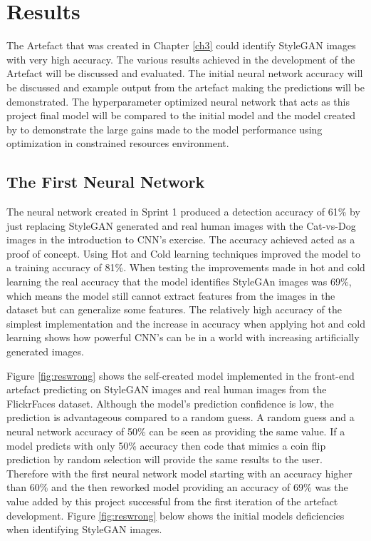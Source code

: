 \chapter{Results}

The Artefact that was created in Chapter \ref{ch3} could identify StyleGAN images with very high accuracy. The various results achieved in the development of the Artefact will be discussed and evaluated. The initial neural network accuracy will be discussed and example output from the artefact making the predictions will be demonstrated. The hyperparameter optimized neural network that acts as this project final model will be compared to the initial model and the model created by \cite{Wang} to demonstrate the large gains made to the model performance using optimization in constrained resources environment. 

\section{The First Neural Network}

The neural network created in Sprint 1 produced a detection accuracy of 61\% by just replacing StyleGAN generated and real human images with the Cat-vs-Dog images in the introduction to CNN's exercise. The accuracy achieved acted as a proof of concept. Using Hot and Cold learning techniques improved the model to a training accuracy of 81\%. When testing the improvements made in hot and cold learning the real accuracy that the model identifies StyleGAn images was 69\%, which means the model still cannot extract features from the images in the dataset but can generalize some features. The relatively high accuracy of the simplest implementation and the increase in accuracy when applying hot and cold learning shows how powerful CNN's can be in a world with increasing artificially generated images. 

Figure \ref{fig:reswrong} shows the self-created model implemented in the front-end artefact predicting on StyleGAN images and real human images from the FlickrFaces dataset. Although the model's prediction confidence is low, the prediction is advantageous compared to a random guess. A random guess and a neural network accuracy of 50\% can be seen as providing the same value. If a model predicts with only 50\% accuracy then code that mimics a coin flip prediction by random selection will provide the same results to the user. Therefore with the first neural network model starting with an accuracy higher than 60\% and the then reworked model providing an accuracy of 69\% was the value added by this project successful from the first iteration of the artefact development. Figure \ref{fig:reswrong} below shows the initial models deficiencies when identifying StyleGAN images.

